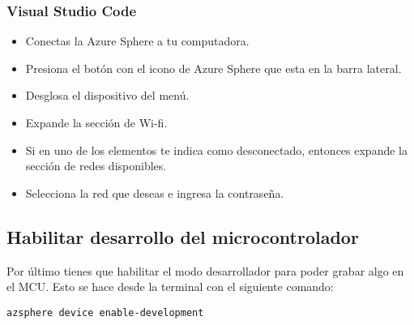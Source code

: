 \subsubsection{Visual Studio Code}
\begin{itemize}
	\item
	Conectas la Azure Sphere a tu computadora.
	\item 
	Presiona el botón con el icono de Azure Sphere que esta en la barra lateral.
	\item 
	Desglosa el dispositivo del menú. 
	\item 
	Expande la sección de Wi-fi.
	\item 
	Si en uno de los elementos te indica como desconectado, entonces expande la sección de redes disponibles.
	\item 
	Selecciona la red que deseas e ingresa la contraseña.
\end{itemize}

\subsection{Habilitar desarrollo del microcontrolador}
Por último tienes que habilitar el modo desarrollador para poder grabar algo en el MCU. Esto se hace desde la terminal con el siguiente comando:
\begin{verbatim}
azsphere device enable-development
\end{verbatim}
